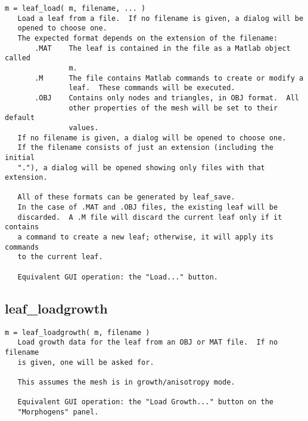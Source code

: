 \begin{verbatim}
m = leaf_load( m, filename, ... )
   Load a leaf from a file.  If no filename is given, a dialog will be
   opened to choose one.
   The expected format depends on the extension of the filename:
       .MAT    The leaf is contained in the file as a Matlab object called
               m.
       .M      The file contains Matlab commands to create or modify a
               leaf.  These commands will be executed.
       .OBJ    Contains only nodes and triangles, in OBJ format.  All
               other properties of the mesh will be set to their default
               values.
   If no filename is given, a dialog will be opened to choose one.
   If the filename consists of just an extension (including the initial
   "."), a dialog will be opened showing only files with that extension.

   All of these formats can be generated by leaf_save.
   In the case of .MAT and .OBJ files, the existing leaf will be
   discarded.  A .M file will discard the current leaf only if it contains
   a command to create a new leaf; otherwise, it will apply its commands
   to the current leaf.

   Equivalent GUI operation: the "Load..." button.
\end{verbatim}

\subsection{leaf\_loadgrowth}\label{section-leaf-loadgrowth}

\begin{verbatim}
m = leaf_loadgrowth( m, filename )
   Load growth data for the leaf from an OBJ or MAT file.  If no filename
   is given, one will be asked for.

   This assumes the mesh is in growth/anisotropy mode.

   Equivalent GUI operation: the "Load Growth..." button on the
   "Morphogens" panel.
\end{verbatim}

